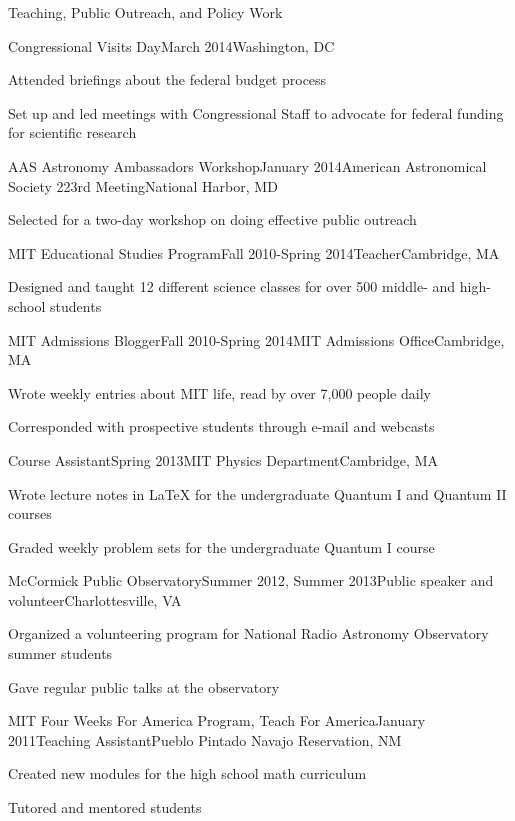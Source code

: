 \documentclass{resume} %
\begin{document}
\begin{rSection}{Teaching, Public Outreach, and Policy Work}

\begin{rSubsection}{Congressional Visits Day}{March 2014}{}{Washington, DC}
\item Attended briefings about the federal budget process
\item Set up and led meetings with Congressional Staff to advocate for federal funding for scientific research
\end{rSubsection}

\begin{rSubsection}{AAS Astronomy Ambassadors Workshop}{January 2014}{American Astronomical Society 223rd Meeting}{National Harbor, MD}
\item Selected for a two-day workshop on doing effective public outreach 
\end{rSubsection}

\begin{rSubsection}{MIT Educational Studies Program}{Fall 2010-Spring 2014}{Teacher}{Cambridge, MA}
\item Designed and taught 12 different science classes for over 500 middle- and high-school students
\end{rSubsection}

\begin{rSubsection}{MIT Admissions Blogger}{Fall 2010-Spring 2014}{MIT Admissions Office}{Cambridge, MA}
\item Wrote weekly entries about MIT life, read by over 7,000 people daily
\item Corresponded with prospective students through e-mail and webcasts
\end{rSubsection}

\begin{rSubsection}{Course Assistant}{Spring 2013}{MIT Physics Department}{Cambridge, MA}
\item Wrote lecture notes in LaTeX for the undergraduate Quantum I and Quantum II courses
\item Graded weekly problem sets for the undergraduate Quantum I course
\end{rSubsection}

\begin{rSubsection}{McCormick Public Observatory}{Summer 2012, Summer 2013}{Public speaker and volunteer}{Charlottesville, VA}
\item Organized a volunteering program for National Radio Astronomy Observatory summer students
\item Gave regular public talks at the observatory
\end{rSubsection}

\begin{rSubsection}{MIT Four Weeks For America Program, Teach For America}{January 2011}{Teaching Assistant}{Pueblo Pintado Navajo Reservation, NM}
\item Created new modules for the high school math curriculum
\item Tutored and mentored students
\end{rSubsection}

\end{rSection}
\end{document}
